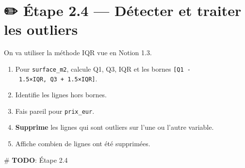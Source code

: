 \documentclass[
  french,
  11pt,
  a4paper,
]{scrbook}
\newenvironment{Shaded}{}{}
\newcommand{\AlertTok}[1]{\textcolor[rgb]{1.00,0.33,0.33}{\textbf{#1}}}
\newcommand{\CommentTok}[1]{\textcolor[rgb]{0.42,0.45,0.49}{#1}}
\providecommand{\tightlist}{%
  \setlength{\itemsep}{0pt}\setlength{\parskip}{0pt}}
\begin{document}
\section{✏️ Étape 2.4 --- Détecter et traiter les
outliers}\label{uxe9tape-2.4-duxe9tecter-et-traiter-les-outliers}

\begin{tcolorbox}[enhanced jigsaw, arc=.35mm, bottomrule=.15mm, bottomtitle=1mm, breakable, colback=white, colbacktitle=quarto-callout-note-color!10!white, colframe=quarto-callout-note-color-frame, coltitle=black, left=2mm, leftrule=.75mm, opacityback=0, opacitybacktitle=0.6, rightrule=.15mm, title={📝 À faire}, titlerule=0mm, toprule=.15mm, toptitle=1mm]

On va utiliser la méthode IQR vue en Notion 1.3.

\begin{enumerate}
\def\labelenumi{\arabic{enumi}.}
\tightlist
\item
  Pour \texttt{surface\_m2}, calcule Q1, Q3, IQR et les bornes
  \texttt{{[}Q1\ -\ 1.5×IQR,\ Q3\ +\ 1.5×IQR{]}}.
\item
  Identifie les lignes hors bornes.
\item
  Fais pareil pour \texttt{prix\_eur}.
\item
  \textbf{Supprime} les lignes qui sont outliers sur l'une ou l'autre
  variable.
\item
  Affiche combien de lignes ont été supprimées.
\end{enumerate}

\end{tcolorbox}

\begin{Shaded}
\begin{Highlighting}[]
\CommentTok{\# }\AlertTok{TODO}\CommentTok{: Étape 2.4}
\end{Highlighting}
\end{Shaded}
\end{document}
